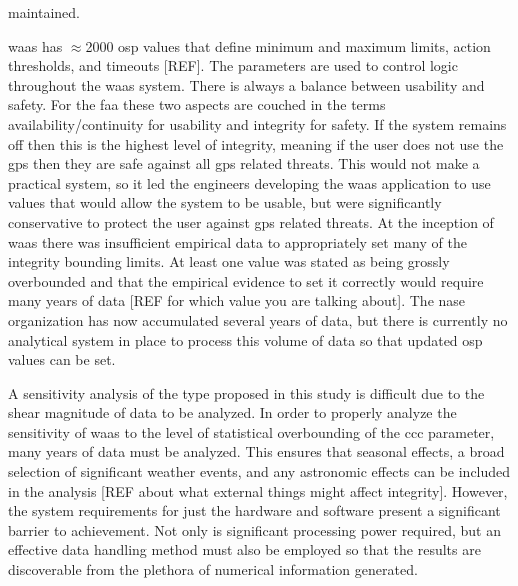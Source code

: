 maintained. %

\ac{waas} has $\approx$2000 \ac{osp} values that define minimum and maximum limits, action thresholds, and timeouts [REF]. The parameters are used to control logic throughout the \ac{waas} system. There is always a balance between usability and safety.  For the \ac{faa} these two aspects are couched in the terms availability/continuity for usability and integrity for safety.  If the system remains off then this is the highest level of integrity, meaning if the user does not use the \ac{gps} then they are safe against all \ac{gps} related threats.  This would not make a practical system, so it led the engineers developing the \ac{waas} application to use values that would allow the system to be usable, but were significantly conservative to protect the user against \ac{gps} related threats.  At the inception of \ac{waas} there was insufficient empirical data to appropriately set many of the integrity bounding limits.  At least one value was stated as being grossly overbounded and that the empirical evidence to set it correctly would require many years of data [REF for which value you are talking about].  The \ac{nase} organization has now accumulated several years of data, but there is currently no analytical system in place to process this volume of data so that updated \ac{osp} values can be set.

A sensitivity analysis of the type proposed in this study is difficult due to the shear magnitude of data to be analyzed. In order to properly analyze the sensitivity of \ac{waas} to the level of statistical overbounding of the \ac{ccc} parameter, many years of data must be analyzed.  This ensures that seasonal effects, a broad selection of significant weather events, and any astronomic effects can be included in the analysis [REF about what external things might affect integrity].  However, the system requirements for just the hardware and software present a significant barrier to achievement. Not only is significant processing power required, but an effective data handling method must also be employed so that the results are discoverable from the plethora of numerical information generated.  %


